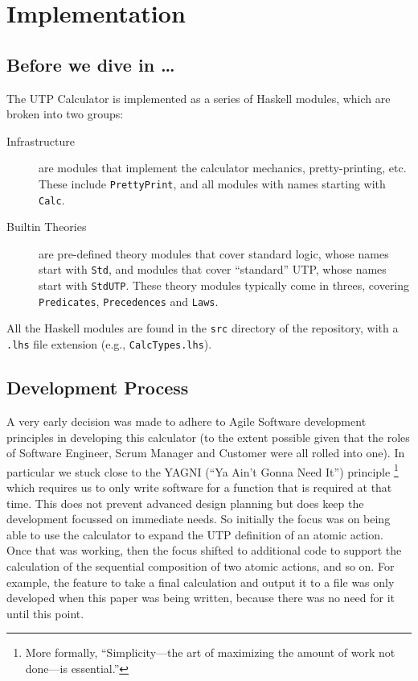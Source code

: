 \section{Implementation}\label{sec:Impl}

\subsection{Before we dive in \dots}

The UTP Calculator is implemented as a series
of Haskell modules,
which are broken into two groups:
\begin{description}
  \item[Infrastructure]
    are modules that implement the calculator mechanics,
    pretty-printing, etc.
    These include \texttt{PrettyPrint},
    and all modules with names starting with \texttt{Calc}.
  \item[Builtin Theories]
    are pre-defined theory modules that cover standard logic,
    whose names start with \texttt{Std}, and modules that cover ``standard''
    UTP, whose names start with \texttt{StdUTP}.
    These theory modules typically come in threes, covering
    \texttt{Predicates}, \texttt{Precedences} and \texttt{Laws}.
\end{description}
All the Haskell modules are found in the \texttt{src} directory
of the repository, with a \texttt{.lhs} file extension
(e.g., \texttt{CalcTypes.lhs}).

\subsection{Development Process}\label{ssec:development}

A very early decision was made to adhere to Agile Software development
principles \cite{Fowl01a}
in developing this calculator
(to the extent possible given that the roles of Software Engineer, Scrum Manager
and Customer were all rolled into one).
In particular we stuck close to the YAGNI (``Ya Ain't Gonna Need It'') principle%
\footnote{More formally, ``Simplicity---the art of maximizing the amount
of work not done---is essential.''}
which requires us to only write software for a function
that is required at that time.
This does not prevent advanced design planning but does keep
the development focussed on immediate needs.
So initially the focus was on being able to use the calculator
to expand the UTP definition of an atomic action.
Once that was working, then the focus shifted to additional code to
support the calculation of the sequential composition of two atomic actions,
and so on.
For example, the feature to take a final calculation and output it to a file
was only developed when this paper was being written,
because there was no need for it until this point.

